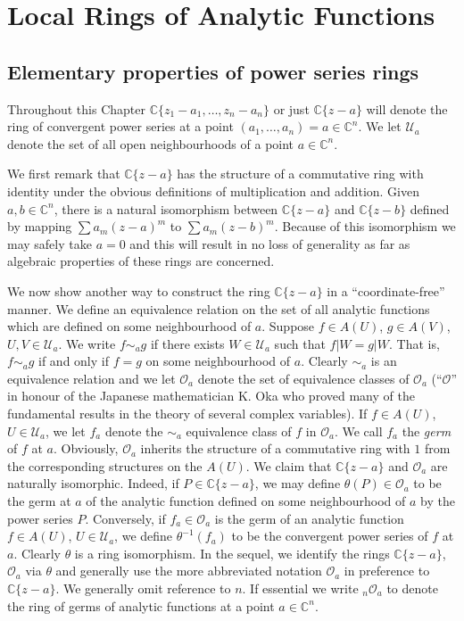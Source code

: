 \chapter{Local Rings of Analytic Functions}\label{ch:3}
\ChapterThreeIntroduction

\section{Elementary properties of power series rings}\label{sec:3:1}
Throughout this Chapter $\mathbb C\{z_1-a_1,\ldots,z_n-a_n\}$ or just $\mathbb C\{z-a\}$ will denote the ring of convergent power series at a point $(a_1,\ldots,a_n)=a\in\mathbb C^n$. We let $\mathcal U_a$ denote the set of all open neighbourhoods of a point $a\in\mathbb C^n$.

We first remark that $\mathbb C\{z-a\}$ has the structure of a commutative ring with identity under the obvious definitions of multiplication and addition. Given $a,b\in\mathbb C^n$, there is a natural isomorphism between $\mathbb C\{z-a\}$ and $\mathbb C\{z-b\}$ defined by mapping $\sum a_m(z-a)^m$ to $\sum a_m(z-b)^m$. Because of this isomorphism we may safely take $a=0$ and this will result in no loss of generality as far as algebraic properties of these rings are concerned.

We now show another way to construct the ring $\mathbb C\{z-a\}$ in a ``coordinate-free'' manner. We define an equivalence relation on the set of all analytic functions which are defined on some neighbourhood of $a$. Suppose $f\in A(U)$, $g\in A(V)$, $U,V\in\mathcal U_a$. We write $f\sim_a g$ if there
exists $W\in\mathcal U_a$ such that $f|W=g|W$. That is, $f\sim_a g$ if and only if $f=g$ on some neighbourhood of $a$. Clearly $\sim_a$ is an equivalence relation and we let $\mathcal O_a$ denote the set of equivalence classes of $\mathcal O_a$ (``$\mathcal O$'' in honour of the Japanese mathematician K. Oka who proved many of the fundamental results in the theory of several complex variables). If $f\in A(U)$, $U\in\mathcal U_a$, we let $f_a$ denote the $\sim_a$ equivalence class of $f$ in $\mathcal O_a$. We call $f_a$ the \emph{germ} of $f$ at $a$. Obviously, $\mathcal O_a$ inherits the structure of a commutative ring with $1$ from the corresponding structures on the $A(U)$. We claim that $\mathbb C\{z-a\}$ and $\mathcal O_a$ are naturally isomorphic. Indeed, if $P\in\mathbb C\{z-a\}$, we may define $\theta(P)\in\mathcal O_a$ to be the germ at $a$ of the analytic function defined on some neighbourhood of $a$ by the power series $P$. Conversely, if $f_a\in\mathcal O_a$ is the germ of an analytic function $f\in A(U)$, $U\in\mathcal U_a$, we define $\theta^{-1}(f_a)$ to be the convergent power series of $f$ at $a$. Clearly $\theta$ is a ring isomorphism. In the sequel, we identify the rings $\mathbb C\{z-a\}$, $\mathcal O_a$ via $\theta$ and generally use the more abbreviated notation $\mathcal O_a$ in preference to $\mathbb C\{z-a\}$. We generally omit reference to $n$. If essential we write ${}_n\mathcal O_a$ to denote the ring of germs of analytic functions at a point $a\in\mathbb C^n$.

